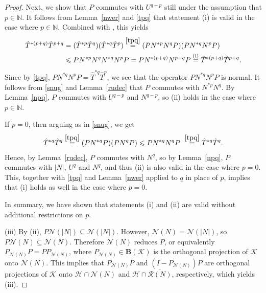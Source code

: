 \documentclass[reqno]{amsproc}
\numberwithin{equation}{section}
\theoremstyle{remark}
\newcommand*{\hh}{\mathcal{H}}
\newcommand*{\kk}{\mathcal{K}}
\newcommand*{\natu}{\mathbb{N}}
\newcommand*{\nul}{\mathscr{N}}
\theoremstyle{definition}
\newcommand*{\Le}{\leqslant}
\newcommand*{\ran}{\mathscr{R}}
\newcommand*{\ogr}{\boldsymbol{B}}
\begin{document}
\begin{proof}
Next, we show that $P$ commutes with $U^{q-p}$ still
under the assumption that $p\in \natu$. It follows
from Lemma~\ref{nwer} and \eqref{tpq} that statement
(i) is valid in the case where $p\in \natu$. Combined
with \cite[Lemma~3.2]{P-S-roots23}, this yields
   \begin{align} \notag
\hat T^{*(p+q)} \hat T^{p+q} & = (\hat T^{*p} \hat
T^{q})(\hat T^{*q} \hat T^{p}) \overset{\eqref{tpq}} =
(P N^{*p} N^{q}P)(P N^{*q} N^{p}P)
   \\ \label{snug}
&\Le P N^{*p} N^{q}N^{*q} N^{p}P = P N^{*(p+q)}
N^{p+q}P \overset{\mathrm{(i)}} = \hat T^{*(p+q)} \hat
T^{p+q}.
   \end{align}
Since by \eqref{tpq}, $P N^{*q} N^{p}P=\hat T^{*q}
\hat T^{p}$, we see that the operator $P N^{*q}
N^{p}P$ is normal. It follows from \eqref{snug} and
Lemma~\ref{rudec} that $P$ commutes with $N^{*p}
N^{q}$. By Lemma~\ref{npq}, $P$ commutes with
$U^{q-p}$ and $N^{q-p}$, so (ii) holds in the case
where~$p\in \natu$.

If $p=0$, then arguing as in \eqref{snug},
we get
   \begin{align*}
\hat T^{*q} \hat T^q \overset{\eqref{tpq}} = (P
N^{*q}P)(P N^{q}P) \Le P N^{*q}N^{q}P
\hspace{.8ex}\overset{\eqref{tpq}} = \hat T^{*q} \hat
T^{q}.
   \end{align*}
Hence, by Lemma~\ref{rudec}, $P$ commutes
with $N^q$, so by Lemma~\ref{npq}, $P$
commutes with $|N|$, $U^{q}$ and $N^{q}$,
and thus (ii) is also valid in the case
where $p=0$. This, together with \eqref{tpq}
and Lemma~\ref{nwer} applied to $q$ in place
of $p$, implies that (i) holds as well in
the case where $p=0$.

In summary, we have shown that statements
(i) and (ii) are valid without additional
restrictions on $p$.

(iii) By (ii), $P\nul(|N|)\subseteq
\nul(|N|)$. However, $\nul(N)=\nul(|N|)$, so
$P\nul(N)\subseteq \nul(N)$. Therefore
$\nul(N)$ reduces $P$, or equivalently
$P_{\nul(N)}P = PP_{\nul(N)}$, where
$P_{\nul(N)}\in \ogr(\kk)$ is the orthogonal
projection of $\kk$ onto $\nul(N)$. This
implies that $P_{\nul(N)}P$ and
$(I-P_{\nul(N)})P$ are orthogonal
projections of $\kk$ onto $\hh\cap\nul(N)$
and $\hh\cap\overline{\ran(N)}$,
respectively, which yields (iii).
   \end{proof}
\end{document}
